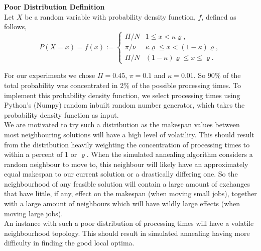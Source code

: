 \documentclass[12pt,a4paper,reqno]{article}
\begin{document}
{\bf Poor Distribution Definition}\\
Let $X$ be a random variable with probability density function, $f$, defined as follows,
\[
P(X=x)=f(x) :=
\begin{cases}
      \Pi/N & 1 \leq x < \kappa\varrho, \\
      \pi/\nu & \kappa\varrho \leq x < (1-\kappa)\varrho, \\
      \Pi/N & (1-\kappa)\varrho\leq x \leq \varrho .
   \end{cases}\textbf{}
\]

For our experiments we chose $\Pi=0.45$, $\pi=0.1$ and $\kappa=0.01$. So 90\% of the total probability was concentrated in 2\% of the possible processing times. To implement this probability density function, we select processing times using Python's (Numpy) random inbuilt random number generator, which takes the probability density function as input. \\

We are motivated to try such a distribution as the makespan values between most neighbouring solutions will have a high level of volatility. This should result from the distribution heavily weighting the concentration of processing times to within a percent of 1 or $\varrho$. When the simulated annealing algorithm considers a random neighbour to move to, this neighbour will likely have an approximately equal makespan to our current solution or a drastically differing one. So the neighbourhood of any feasible solution will contain a large amount of exchanges that have little, if any, effect on the makespan (when moving small jobs), together with a large amount of neighbours which will have wildly large effects (when moving large jobs). \\

An instance with such a poor distribution of processing times will have a volatile neighbourhood topology. This should result in simulated annealing having more difficulty in finding the good local optima.

\end{document}

